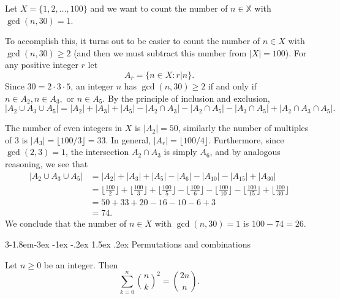 \documentclass{tufte-handout}
\makeatletter
\renewcommand{\subsection}{\@startsection{subsection}%
    {3}{-1.8em}{-3ex \@plus -1ex \@minus -.2ex}%
    {1.5ex \@plus .2ex}
    {\hspace*{-5.5em}\fcolorbox{ltblue}{ltblue}{\parbox[c][1.0ex][b]{4em}{\phantom{space}}}
    \normalfont\large\itshape\color{ltblue}}}
\makeatother
\begin{document}
\begin{Example}
Let \( X = \{1,2,\ldots,100\} \) and we want to count the number of \( n \in \mathbb{X} \)
with \( \gcd(n,30) = 1\). 
\end{Example}
To accomplish this, it turns out to be easier to count the number of \( n \in X \) with \( \gcd(n,30) \geq 2 \)
(and then we must subtract this number from \( \left|X\right| = 100 \)). For
any positive integer \( r \) let
\[ A_r = \{n \in X: r|n\}.\]
Since \( 30 = 2 \cdot 3 \cdot 5 \), an integer \( n \) has \( \gcd(n,30) \geq 2 \) if and only if
\( n \in A_2, n \in A_3, \text{ or } n \in A_5 \). By the principle of inclusion and exclusion,
\[\left|A_2 \cup A_3 \cup A_5\right| = \left|A_2\right| + \left|A_3\right| + \left|A_5\right| - \left|A_2 \cap A_3\right| - 
\left|A_2 \cap A_5\right| - \left|A_3 \cap A_5\right| + \left|A_2 \cap A_3 \cap A_5\right|.\]

The number of even integers in \( X \) is \( \left|A_2\right| = 50 \), similarly the number of multiples of 3 is 
\( \left|A_3\right| = \lfloor100 \slash 3 \rfloor= 33 \). In general, \( \left|A_r\right| = \lfloor 100 \slash 4 \rfloor \).
Furthermore, since \( \gcd(2,3) = 1 \), the intersection \( A_2 \cap A_3 \) is simply \( A_6 \),
and by analogous reasoning, we see that
\begin{align*}
    \left|A_2 \cup A_3 \cup A_5\right| &= \left|A_2\right| + \left|A_3\right| + \left|A_5\right| - \left|A_6\right| 
    - \left|A_{10}\right| - \left|A_{15}\right| + \left|A_{30}\right|\\
    &= \lfloor\frac{100}{2}\rfloor + \lfloor\frac{100}{3}\rfloor + \lfloor\frac{100}{5}\rfloor - \lfloor\frac{100}{6}\rfloor
    - \lfloor\frac{100}{10}\rfloor - \lfloor\frac{100}{15}\rfloor + \lfloor\frac{100}{30}\rfloor\\
    &= 50 + 33 + 20 - 16 - 10 - 6 + 3 \\
    &= 74.
\end{align*}
We conclude that the number of \( n \in X \) with \( \gcd(n,30) = 1 \) is \( 100 - 74 = 26 \).

\subsection{Permutations and combinations}

\begin{Proposition}
    Let \( n \geq 0 \) be an integer. Then
    \[ \sum_{k=0}^{n}\binom{n}{k}^2 = \binom{2n}{n}.\]
\end{Proposition}
\end{document}
